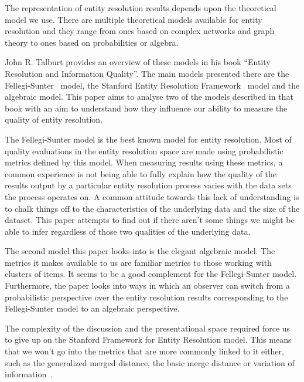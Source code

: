 \documentclass[journal]{IEEEtran}
\begin{document}
    The representation of entity resolution results depends upon the theoretical
    model we use.
    There are multiple theoretical models available for entity resolution and
    they range from ones based on complex networks and graph theory\cite{Li2020}
    to ones based on probabilities\cite{fs1969} or
    algebra\cite{Tal11,Ben2009Swoosh}.

    John R. Talburt provides an overview of these models in his book ``Entity
    Resolution and Information Quality''\cite{Tal11}.
    The main models presented there are the Fellegi-Sunter~\cite{fs1969} model,
    the Stanford Entity Resolution Framework~\cite{Ben2009Swoosh} model and the
    algebraic\cite{tal2007algebraic} model.
    This paper aims to analyse two of the models described in that book with an
    aim to understand how they influence our ability to measure the quality of
    entity resolution.

    The Fellegi-Sunter model is the best known model for entity resolution.
    Most of quality evaluations in the entity resolution space are made using
    probabilistic metrics defined by this model.
    When measuring results using these metrics, a common experience is not being
    able to fully explain how the quality of the results output by a particular
    entity resolution process varies with the data sets the process operates on.
    A common attitude towards this lack of understanding is to chalk things off
    to the characteristics of the underlying data and the size of the dataset.
    This paper attempts to find out if there aren't some things we might be able
    to infer regardless of those two qualities of the underlying data.

    The second model this paper looks into is the elegant algebraic model.
    The metrics it makes available to us are familiar metrics to those working
    with clusters of items.
    It seems to be a good complement for the Fellegi-Sunter model.
    Furthermore, the paper looks into ways in which an observer can switch from
    a probabilistic perspective over the entity resolution results corresponding
    to the Fellegi-Sunter model to an algebraic perspective.

    The complexity of the discussion and the presentational space required force
    us to give up on the Stanford Framework for Entity Resolution model.
    This means that we won't go into the metrics that are more commonly linked
    to it either, such as the generalized merged distance, the basic merge
    distance or variation of information~\cite{Men10}.
\end{document}
